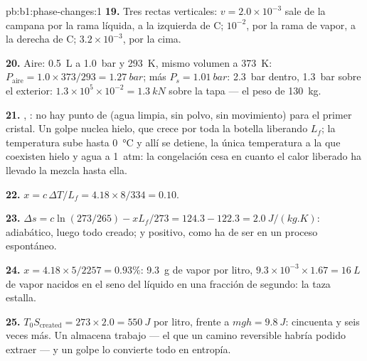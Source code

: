 \begin{solution}{pb:b1:phase-changes:1}
\textbf{19.} Tres rectas verticales: $v = 2.0 \times 10^{-3}$ sale de la campana
por la rama líquida, a la izquierda de C; $10^{-2}$, por la rama de vapor,
a la derecha de C; $3.2 \times 10^{-3}$, por la cima.

\textbf{20.} Aire: \qty{0.5}{L} a \qty{1.0}{bar} y \qty{293}{K}, mismo volumen a
\qty{373}{K}: $P_{\text{aire}} = 1.0 \times 373/293 = \qty{1.27}{bar}$; más
$P_s = \qty{1.01}{bar}$: \qty{2.3}{bar} dentro, \qty{1.3}{bar} sobre el
exterior: $1.3 \times 10^5 \times 10^{-2} = \qty{1.3}{kN}$ sobre la tapa --- el
peso de \qty{130}{kg}.

\textbf{21.} , : no hay punto de 
(agua limpia, sin polvo, sin movimiento) para el primer cristal. Un golpe
nuclea hielo, que crece por toda la botella liberando $L_f$; la
temperatura sube hasta \qty{0}{\degreeCelsius} y allí se detiene, la única
temperatura a la que coexisten hielo y agua a \qty{1}{atm}: la congelación
cesa en cuanto el calor liberado ha llevado la mezcla hasta ella.

\textbf{22.} $x = c\,\Delta T/L_f = 4.18 \times 8/334 = 0.10$.

\textbf{23.} $\Delta s = c\ln(273/265) - xL_f/273 = 124.3 - 122.3 =
\qty{+2.0}{J/(kg.K)}$: adiabático, luego todo creado; y positivo, como ha
de ser en un proceso espontáneo.

\textbf{24.} $x = 4.18 \times 5/2257 = 0.93\%$: \qty{9.3}{g} de vapor por litro,
$9.3 \times 10^{-3} \times 1.67 = \qty{16}{L}$ de vapor nacidos en el seno del
líquido en una fracción de segundo: la taza estalla.

\textbf{25.} $T_0S_{\mathrm{created}} = 273 \times 2.0 = \qty{550}{J}$ por litro,
frente a $mgh = \qty{9.8}{J}$: cincuenta y seis veces más. Un  almacena trabajo --- el que un camino reversible habría podido
extraer --- y un golpe lo convierte todo en entropía.
\end{solution}
